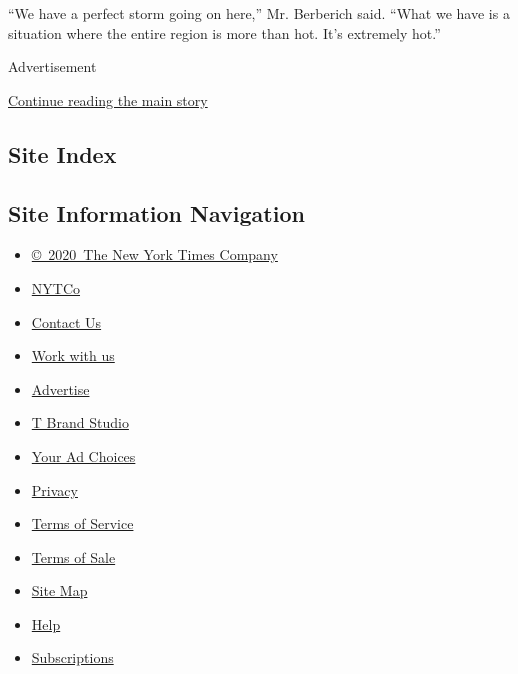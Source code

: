 ``We have a perfect storm going on here,'' Mr. Berberich said. ``What we
have is a situation where the entire region is more than hot. It's
extremely hot.''

Advertisement

\protect\hyperlink{after-bottom}{Continue reading the main story}

\hypertarget{site-index}{%
\subsection{Site Index}\label{site-index}}

\hypertarget{site-information-navigation}{%
\subsection{Site Information
Navigation}\label{site-information-navigation}}

\begin{itemize}
\tightlist
\item
  \href{https://help.nytimes3xbfgragh.onion/hc/en-us/articles/115014792127-Copyright-notice}{©~2020~The
  New York Times Company}
\end{itemize}

\begin{itemize}
\tightlist
\item
  \href{https://www.nytco.com/}{NYTCo}
\item
  \href{https://help.nytimes3xbfgragh.onion/hc/en-us/articles/115015385887-Contact-Us}{Contact
  Us}
\item
  \href{https://www.nytco.com/careers/}{Work with us}
\item
  \href{https://nytmediakit.com/}{Advertise}
\item
  \href{http://www.tbrandstudio.com/}{T Brand Studio}
\item
  \href{https://www.nytimes3xbfgragh.onion/privacy/cookie-policy\#how-do-i-manage-trackers}{Your
  Ad Choices}
\item
  \href{https://www.nytimes3xbfgragh.onion/privacy}{Privacy}
\item
  \href{https://help.nytimes3xbfgragh.onion/hc/en-us/articles/115014893428-Terms-of-service}{Terms
  of Service}
\item
  \href{https://help.nytimes3xbfgragh.onion/hc/en-us/articles/115014893968-Terms-of-sale}{Terms
  of Sale}
\item
  \href{https://spiderbites.nytimes3xbfgragh.onion}{Site Map}
\item
  \href{https://help.nytimes3xbfgragh.onion/hc/en-us}{Help}
\item
  \href{https://www.nytimes3xbfgragh.onion/subscription?campaignId=37WXW}{Subscriptions}
\end{itemize}
